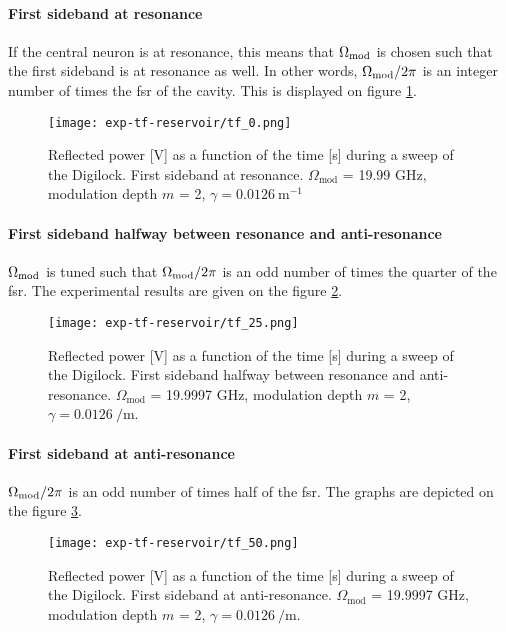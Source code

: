 \paragraph{First sideband at resonance} If the central neuron is at resonance, this means that $\Omega_{\text{mod}}$ is chosen such that the first sideband is at resonance as well. In other words, $\Omega_{\text{mod}}/2\pi$ is an integer number of times the \gls{fsr} of the cavity. This is displayed on figure \ref{tf_0}.

\begin{figure}
	\centering
	\texttt{[image: exp-tf-reservoir/tf\_0.png]}
	\caption{Reflected power [V] as a function of the time [s] during a sweep of the Digilock. First sideband at resonance. $\Omega_{\text{mod}}$ = 19.99 GHz, modulation depth $m$ = 2, $\gamma = 0.0126~\text{m}^{-1}$}
	\label{tf_0}
\end{figure}

\paragraph{First sideband halfway between resonance and anti-resonance} $\Omega_{\text{mod}}$ is tuned such that $\Omega_{\text{mod}}/2\pi$ is an odd number of times the quarter of the \gls{fsr}. The experimental results are given on the figure \ref{tf_25}.

\begin{figure}
	\centering
	\texttt{[image: exp-tf-reservoir/tf\_25.png]}
	\caption{Reflected power [V] as a function of the time [s] during a sweep of the Digilock. First sideband halfway between resonance and anti-resonance. $\Omega_{\text{mod}}$ = 19.9997 GHz, modulation depth $m$ = 2, $\gamma = \SI{0.0126}{\per\metre}$.}
	\label{tf_25}
\end{figure}

\paragraph{First sideband at anti-resonance} $\Omega_{\text{mod}}/2\pi$ is an odd number of times half of the \gls{fsr}. The graphs are depicted on the figure \ref{tf_50}.\\

\begin{figure}
	\centering
	\texttt{[image: exp-tf-reservoir/tf\_50.png]}
	\caption{Reflected power [V] as a function of the time [s] during a sweep of the Digilock. First sideband at anti-resonance. $\Omega_{\text{mod}}$ = 19.9997 GHz, modulation depth $m$ = 2, $\gamma = \SI{0.0126}{\per\metre}$.}
	\label{tf_50}
\end{figure}

